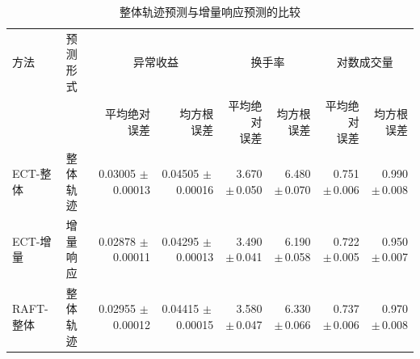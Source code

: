 \begin{table}[!htbp]
\centering
\caption{整体轨迹预测与增量响应预测的比较}\label{tab:incremental_comparison}
\fontsize{9.2}{11.2}\selectfont
\setlength{\tabcolsep}{3pt}
\renewcommand{\arraystretch}{1.08}
\begin{tabular*}{\linewidth}{@{\extracolsep{\fill}}llrrrrrr@{}}
\toprule
方法 & 预测形式 & \multicolumn{2}{c}{异常收益} & \multicolumn{2}{c}{换手率} & \multicolumn{2}{c}{对数成交量} \\
\cmidrule(lr){3-4}\cmidrule(lr){5-6}\cmidrule(lr){7-8}
 &  & \shortstack{平均绝对\\误差} & \shortstack{均方根\\误差} & \shortstack{平均绝对\\误差} & \shortstack{均方根\\误差} & \shortstack{平均绝对\\误差} & \shortstack{均方根\\误差} \\
\midrule
ECT-整体 & 整体轨迹 & \shortstack[r]{0.03005\\{\scriptsize $\pm$\,0.00013}} & \shortstack[r]{0.04505\\{\scriptsize $\pm$\,0.00016}} & \shortstack[r]{3.670\\{\scriptsize $\pm$\,0.050}} & \shortstack[r]{6.480\\{\scriptsize $\pm$\,0.070}} & \shortstack[r]{0.751\\{\scriptsize $\pm$\,0.006}} & \shortstack[r]{0.990\\{\scriptsize $\pm$\,0.008}} \\[3pt]
ECT-增量 & 增量响应 & \shortstack[r]{0.02878\\{\scriptsize $\pm$\,0.00011}} & \shortstack[r]{0.04295\\{\scriptsize $\pm$\,0.00013}} & \shortstack[r]{3.490\\{\scriptsize $\pm$\,0.041}} & \shortstack[r]{6.190\\{\scriptsize $\pm$\,0.058}} & \shortstack[r]{0.722\\{\scriptsize $\pm$\,0.005}} & \shortstack[r]{0.950\\{\scriptsize $\pm$\,0.007}} \\[3pt]
RAFT-整体 & 整体轨迹 & \shortstack[r]{0.02955\\{\scriptsize $\pm$\,0.00012}} & \shortstack[r]{0.04415\\{\scriptsize $\pm$\,0.00015}} & \shortstack[r]{3.580\\{\scriptsize $\pm$\,0.047}} & \shortstack[r]{6.330\\{\scriptsize $\pm$\,0.066}} & \shortstack[r]{0.737\\{\scriptsize $\pm$\,0.006}} & \shortstack[r]{0.970\\{\scriptsize $\pm$\,0.008}} \\[3pt]

\end{tabular*}
\end{table}

